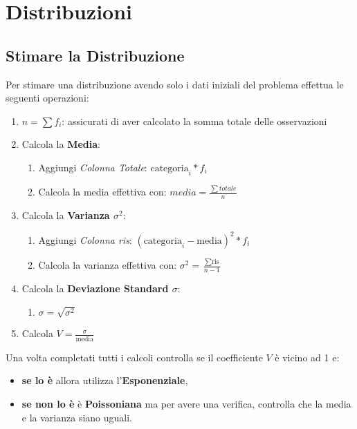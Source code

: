 \chapter{Distribuzioni}

\section{Stimare la Distribuzione}\label{stimare-distribuzione}

Per stimare una distribuzione avendo solo i dati iniziali del problema effettua
le seguenti operazioni:

\begin{enumerate}
      \item $n = \sum{f_i}$: assicurati di aver calcolato la somma totale delle
            osservazioni
      \item Calcola la \textbf{Media}: \begin{enumerate}
                  \item Aggiungi \textit{Colonna Totale}: $\text{categoria}_i * f_i$
                  \item Calcola la media effettiva con: $media = \frac{\sum
                                    totale}{n}$
            \end{enumerate}
      \item Calcola la \textbf{Varianza $\sigma^2$}: \begin{enumerate}
                  \item Aggiungi \textit{Colonna ris}: $(\text{categoria}_i -
                              \text{media})^2 * f_i$
                  \item Calcola la varianza effettiva con: $\sigma^2 = \frac{\sum
                                    \text{ris}}{n -1}$
            \end{enumerate}
      \item Calcola la \textbf{Deviazione Standard $\sigma$}: \begin{enumerate}
                  \item $\sigma = \sqrt{\sigma^2}$
            \end{enumerate}
      \item Calcola $V = \frac{\sigma}{\text{media}}$
\end{enumerate}

Una volta completati tutti i calcoli controlla se il coefficiente $V$ è vicino
ad 1 e:
\begin{itemize}
      \item \textbf{se lo è} allora utilizza l'\textbf{Esponenziale},
      \item \textbf{se non lo è} è \textbf{Poissoniana} ma per avere una verifica,
            controlla che la media e la varianza siano uguali.
\end{itemize}

